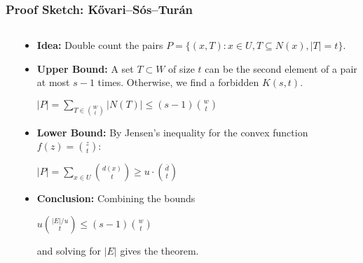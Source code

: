 \documentclass{beamer}
\theoremstyle{mystyle}
\begin{document}
\begin{frame}[fragile] %
    \frametitle{Proof Sketch: Kővari--Sós--Turán}

    \begin{columns}[T] %
        \begin{column}{.6\textwidth}
            \centering
            \resizebox{\textwidth}{!}{
                
            }
        \end{column}
        \begin{column}{.4\textwidth}
            \begin{itemize}
                \item<1-> \textbf{Idea:} Double count the pairs $P = \{ (x, T) : x \in U, T \subseteq N(x), |T|=t \}$.

                \item<2-> \textbf{Upper Bound:}
                A set $T \subset W$ of size $t$ can be the second element of a pair at most $s-1$ times. Otherwise, we find a forbidden $K(s,t)$.
                \vspace{0.5em}

                {\color{blue!70!black}
                $|P| = \sum_{T \in \binom{W}{t}} |N(T)| \le (s-1) \binom{w}{t}$
                }

                \item<3-> \textbf{Lower Bound:}
                By Jensen's inequality for the convex function $f(z)=\binom{z}{t}$:
                \vspace{0.5em}

                {\color{teal!70!black}
                $|P| = \sum_{x \in U} \binom{d(x)}{t} \ge u \cdot \binom{\bar{d}}{t}$
                }

                \item<4-> \textbf{Conclusion:} Combining the bounds

                $u \binom{|E|/u}{t} \le (s-1) \binom{w}{t}$

                and solving for $|E|$ gives the theorem.
            \end{itemize}
        \end{column}
    \end{columns}
\end{frame}
\end{document}
